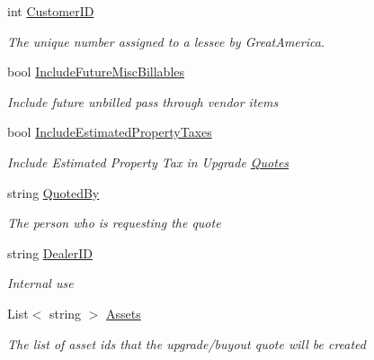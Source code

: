 \begin{DoxyCompactItemize}
\item 
int \mbox{\hyperlink{class_g_f_s_c_1_1_services_1_1_end_of_term_1_1_quote_request_a1c6234faf200e4306cc839b47ca40f3c}{Customer\+ID}}
\begin{DoxyCompactList}\small\item\em The unique number assigned to a lessee by Great\+America. \end{DoxyCompactList}\item 
bool \mbox{\hyperlink{class_g_f_s_c_1_1_services_1_1_end_of_term_1_1_quote_request_a3a383f2e472c4edea42ff52c7815512f}{Include\+Future\+Misc\+Billables}}
\begin{DoxyCompactList}\small\item\em Include future unbilled pass through vendor items \end{DoxyCompactList}\item 
bool \mbox{\hyperlink{class_g_f_s_c_1_1_services_1_1_end_of_term_1_1_quote_request_a61cd6b965208dd65a838b5bc47f7ec00}{Include\+Estimated\+Property\+Taxes}}
\begin{DoxyCompactList}\small\item\em Include Estimated Property Tax in Upgrade \mbox{\hyperlink{class_g_f_s_c_1_1_services_1_1_end_of_term_1_1_quotes}{Quotes}} \end{DoxyCompactList}\item 
string \mbox{\hyperlink{class_g_f_s_c_1_1_services_1_1_end_of_term_1_1_quote_request_a15ba7c16dfd4f41928a2c318af891e9d}{Quoted\+By}}
\begin{DoxyCompactList}\small\item\em The person who is requesting the quote \end{DoxyCompactList}\item 
string \mbox{\hyperlink{class_g_f_s_c_1_1_services_1_1_end_of_term_1_1_quote_request_a93ab2457edced4652493905d7b0db24d}{Dealer\+ID}}
\begin{DoxyCompactList}\small\item\em Internal use \end{DoxyCompactList}\item 
List$<$ string $>$ \mbox{\hyperlink{class_g_f_s_c_1_1_services_1_1_end_of_term_1_1_quote_request_a3030cd3a25f48cea70c7d2ab523fff6c}{Assets}}
\begin{DoxyCompactList}\small\item\em The list of asset ids that the upgrade/buyout quote will be created \end{DoxyCompactList}\end{DoxyCompactItemize}


